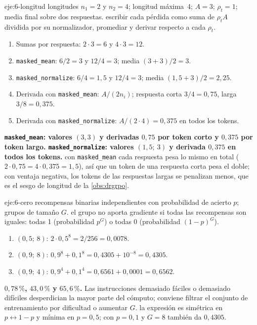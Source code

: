 \begin{solucion}{eje:6-longitud}
\datos longitudes $n_1=2$ y $n_2=4$; longitud máxima~4; $A=3$; $\rho_t=1$; media final sobre dos respuestas.
\planteamiento escribir cada pérdida como suma de $\rho_tA$ dividida por su normalizador, promediar y derivar respecto a cada $\rho_t$.
\pasos
\begin{enumerate}[label=\arabic*.]
  \item Sumas por respuesta: $2\cdot 3=6$ y $4\cdot 3=12$.
  \item \texttt{masked\_\allowbreak{}mean}: $6/2=3$ y $12/4=3$; media $(3+3)/2=3$.
  \item \texttt{masked\_\allowbreak{}normalize}: $6/4=1{,}5$ y $12/4=3$; media $(1{,}5+3)/2=2{,}25$.
  \item Derivada con \texttt{masked\_\allowbreak{}mean}: $A/(2n_i)$; respuesta corta $3/4=0{,}75$, larga $3/8=0{,}375$.
  \item Derivada con \texttt{masked\_\allowbreak{}normalize}: $A/(2\cdot 4)=0{,}375$ en todos los tokens.
\end{enumerate}
\resultado \textbf{\texttt{masked\_\allowbreak{}mean}: valores $(3,3)$ y derivadas $0{,}75$ por token corto y $0{,}375$ por token largo. \texttt{masked\_\allowbreak{}normalize}: valores $(1{,}5;\ 3)$ y derivada $0{,}375$ en todos los tokens.}
\comprobacion con \texttt{masked\_\allowbreak{}mean} cada respuesta pesa lo mismo en total ($2\cdot 0{,}75=4\cdot 0{,}375=1{,}5$), así que un token de una respuesta corta pesa el doble; con ventaja negativa, los tokens de las respuestas largas se penalizan menos, que es el sesgo de longitud de la \cref{obs:drgrpo}.
\end{solucion}

\begin{solucion}{eje:6-cero}
\datos recompensas binarias independientes con probabilidad de acierto $p$; grupos de tamaño $G$.
\planteamiento el grupo no aporta gradiente si todas las recompensas son iguales: todas 1 (probabilidad $p^{G}$) o todas 0 (probabilidad $(1-p)^{G}$).
\pasos
\begin{enumerate}[label=\arabic*.]
  \item $(0{,}5;\ 8)$: $2\cdot 0{,}5^{8}=2/256=0{,}0078$.
  \item $(0{,}9;\ 8)$: $0{,}9^{8}+0{,}1^{8}=0{,}4305+10^{-8}=0{,}4305$.
  \item $(0{,}9;\ 4)$: $0{,}9^{4}+0{,}1^{4}=0{,}6561+0{,}0001=0{,}6562$.
\end{enumerate}
\resultado \textbf{$0{,}78\,\%$, $43{,}0\,\%$ y $65{,}6\,\%$.} Las instrucciones demasiado fáciles o demasiado difíciles desperdician la mayor parte del cómputo; conviene filtrar el conjunto de entrenamiento por dificultad o aumentar $G$.
\comprobacion la expresión es simétrica en $p\leftrightarrow 1-p$ y mínima en $p=0{,}5$; con $p=0{,}1$ y $G=8$ también da $0{,}4305$.
\end{solucion}

